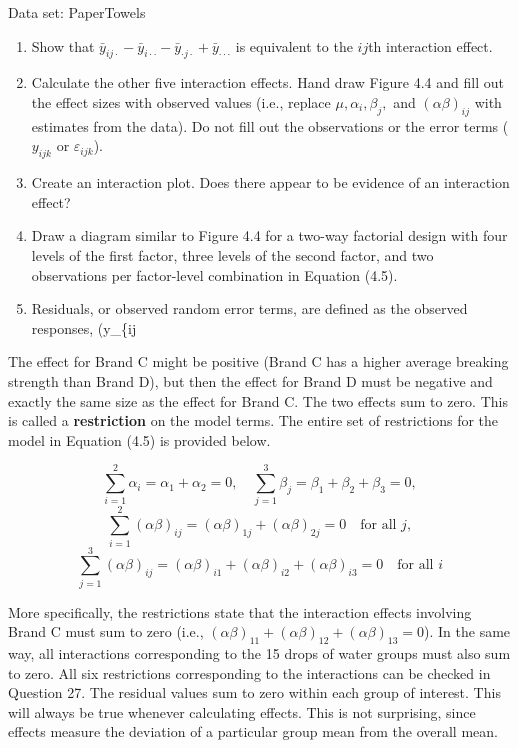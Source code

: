 \documentclass[
]{report}
\theoremstyle{definition}
\theoremstyle{definition}
\theoremstyle{definition}
\theoremstyle{definition}
\theoremstyle{remark}
\begin{document}
Data set: PaperTowels

\begin{enumerate}
\def\labelenumi{\arabic{enumi}.}
\setcounter{enumi}{25}
\item
  Show that \(\bar y_{ij\cdot} - \bar y_{i\cdot\cdot} - \bar y_{\cdot j\cdot} + \bar y_{\cdot\cdot\cdot}\) is equivalent to the \(ij\)th interaction effect.
\item
  Calculate the other five interaction effects. Hand draw Figure 4.4 and fill out the effect sizes with observed values (i.e., replace \(\mu, \alpha_i, \beta_j,\) and \((\alpha\beta)_{ij}\) with estimates from the data). Do not fill out the observations or the error terms (\(y_{ijk}\) or \(\varepsilon_{ijk}\)).
\item
  Create an interaction plot. Does there appear to be evidence of an interaction effect?
\item
  Draw a diagram similar to Figure 4.4 for a two-way factorial design with four levels of the first factor, three levels of the second factor, and two observations per factor-level combination in Equation (4.5).
\item
  Residuals, or observed random error terms, are defined as the observed responses, (y\_\{ij
\end{enumerate}

The effect for Brand C might be positive (Brand C has a higher average breaking strength than Brand D), but then the effect for Brand D must be negative and exactly the same size as the effect for Brand C. The two effects sum to zero. This is called a \textbf{restriction} on the model terms. The entire set of restrictions for the model in Equation (4.5) is provided below.

\[
\sum_{i=1}^2 \alpha_i = \alpha_1 + \alpha_2 = 0,
\quad
\sum_{j=1}^3 \beta_j = \beta_1 + \beta_2 + \beta_3 = 0,
\]
\[
\sum_{i=1}^2 (\alpha\beta)_{ij} = (\alpha\beta)_{1j} + (\alpha\beta)_{2j} = 0
\quad\text{for all } j,
\]
\[
\sum_{j=1}^3 (\alpha\beta)_{ij} = (\alpha\beta)_{i1} + (\alpha\beta)_{i2} + (\alpha\beta)_{i3} = 0
\quad\text{for all } i
\tag{4.8}
\]

More specifically, the restrictions state that the interaction effects involving Brand C must sum to zero
(i.e., \((\alpha\beta)_{11} + (\alpha\beta)_{12} + (\alpha\beta)_{13} = 0\)).
In the same way, all interactions corresponding to the 15 drops of
water groups must also sum to zero. All six restrictions corresponding to the interactions can be checked in
Question 27. The residual values sum to zero within each group of interest. This will always be true whenever
calculating effects. This is not surprising, since effects measure the deviation of a particular group mean from
the overall mean.
\end{document}
